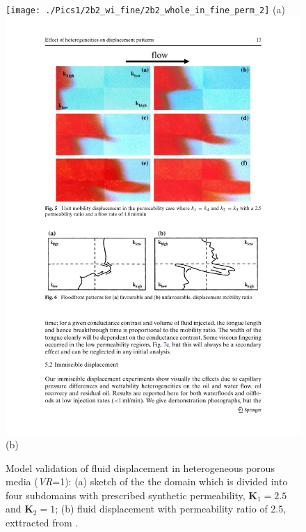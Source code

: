 \begin{figure}[ht] 
    \vbox{
       \hbox{\hspace{1.cm}\texttt{[image: ./Pics1/2b2\_wi\_fine/2b2\_whole\_in\_fine\_perm\_2]}}
       \vspace{0.cm}
       \hbox{\hspace{7cm}(a)}
       \vspace{0.cm}
       \hbox{\hspace{1.cm}\includegraphics[width=\textwidth]{./Pics1/DaweGrattoni_Experiment/1pageb}}
       \vspace{0.cm}
       \hbox{\hspace{7cm}(b)}
    }   
\caption{Model validation of fluid displacement in heterogeneous porous media ({\it VR}=1): (a) sketch of the the domain which is divided into four subdomains with prescribed synthetic permeability, $\mathbf{K}_{1}=2.5$ and $\mathbf{K}_{2}=1$; (b) fluid displacement with permeability ratio of 2.5, exttracted from \citet{dawe_2008}. }
\label{DaweGrattoniExperiment_a}
\end{figure}
\clearpage




